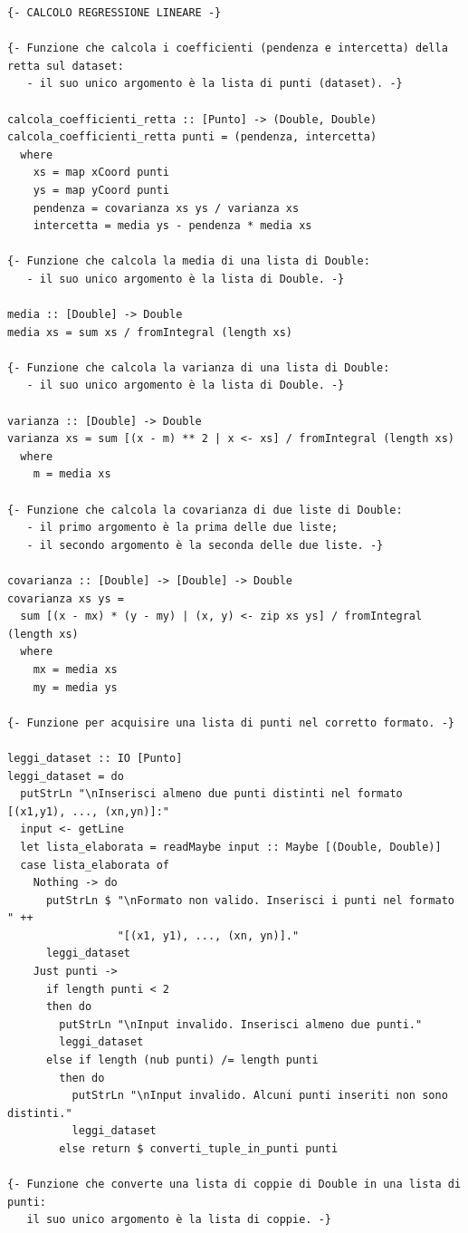 \documentclass[11pt]{article}
\theoremstyle{definition}
\begin{document}
\begin{verbatim}
{- CALCOLO REGRESSIONE LINEARE -}

{- Funzione che calcola i coefficienti (pendenza e intercetta) della retta sul dataset: 
   - il suo unico argomento è la lista di punti (dataset). -}
   
calcola_coefficienti_retta :: [Punto] -> (Double, Double)
calcola_coefficienti_retta punti = (pendenza, intercetta)
  where
    xs = map xCoord punti
    ys = map yCoord punti
    pendenza = covarianza xs ys / varianza xs
    intercetta = media ys - pendenza * media xs

{- Funzione che calcola la media di una lista di Double:
   - il suo unico argomento è la lista di Double. -}
   
media :: [Double] -> Double
media xs = sum xs / fromIntegral (length xs)

{- Funzione che calcola la varianza di una lista di Double:
   - il suo unico argomento è la lista di Double. -}

varianza :: [Double] -> Double
varianza xs = sum [(x - m) ** 2 | x <- xs] / fromIntegral (length xs)
  where
    m = media xs

{- Funzione che calcola la covarianza di due liste di Double:
   - il primo argomento è la prima delle due liste;
   - il secondo argomento è la seconda delle due liste. -}

covarianza :: [Double] -> [Double] -> Double
covarianza xs ys = 
  sum [(x - mx) * (y - my) | (x, y) <- zip xs ys] / fromIntegral (length xs)
  where
    mx = media xs
    my = media ys

{- Funzione per acquisire una lista di punti nel corretto formato. -}

leggi_dataset :: IO [Punto]
leggi_dataset = do
  putStrLn "\nInserisci almeno due punti distinti nel formato [(x1,y1), ..., (xn,yn)]:"
  input <- getLine
  let lista_elaborata = readMaybe input :: Maybe [(Double, Double)]
  case lista_elaborata of
    Nothing -> do
      putStrLn $ "\nFormato non valido. Inserisci i punti nel formato " ++
                 "[(x1, y1), ..., (xn, yn)]."
      leggi_dataset
    Just punti -> 
      if length punti < 2 
      then do
        putStrLn "\nInput invalido. Inserisci almeno due punti."
        leggi_dataset
      else if length (nub punti) /= length punti
        then do
          putStrLn "\nInput invalido. Alcuni punti inseriti non sono distinti."
          leggi_dataset
        else return $ converti_tuple_in_punti punti

{- Funzione che converte una lista di coppie di Double in una lista di punti:
   il suo unico argomento è la lista di coppie. -}


\end{verbatim}
\end{document}
